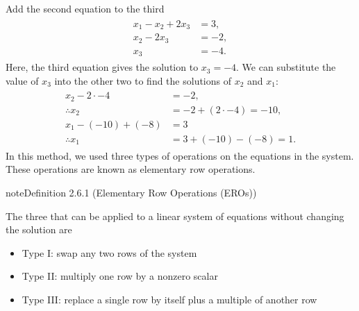 \documentclass[letterpaper,10pt,english]{jupyterBook}
\begin{document}
\sphinxAtStartPar
Add the second equation to the third
\begin{equation*}
\begin{split} \begin{align*}
    x_1 - x_2 + 2x_3 &= 3, \\
    x_2 - 2 x_3 &= -2, \\
    x_3 &= -4.
\end{align*} \end{split}
\end{equation*}
\sphinxAtStartPar
Here, the third equation gives the solution to \(x_3=-4\). We can substitute the value of \(x_3\) into the other two to find the solutions of \(x_2\) and \(x_1\):
\begin{equation*}
\begin{split} \begin{align*}
    x_2 - 2 \cdot -4 &= -2, \\
    \therefore x_2 &= -2 + (2 \cdot -4) = -10, \\
    x_1 - (-10) + (-8) &= 3 \\
    \therefore x_1 &= 3 + (-10) - (-8) = 1.
\end{align*} \end{split}
\end{equation*}
\sphinxAtStartPar
In this method, we used three types of operations on the equations in the system. These operations are known as elementary row operations.

\ignorespaces \label{_pages/2.3_Gaussian_elimination:ero-definition}
\begin{sphinxadmonition}{note}{Definition 2.6.1 (Elementary Row Operations (EROs))}



\sphinxAtStartPar
The three  that can be applied to a linear system of equations without changing the solution are
\begin{itemize}
\item {} 
\sphinxAtStartPar
Type I: swap any two rows of the system

\item {} 
\sphinxAtStartPar
Type II: multiply one row by a non\sphinxhyphen{}zero scalar

\item {} 
\sphinxAtStartPar
Type III: replace a single row by itself plus a multiple of another row

\end{itemize}
\end{sphinxadmonition}
\end{document}
